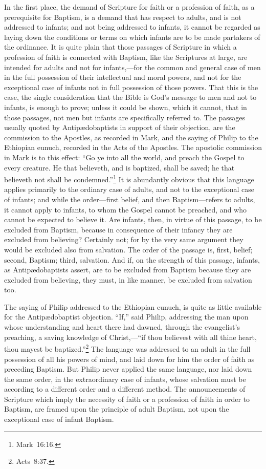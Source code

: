 \documentclass[
]{book}
\begin{document}
In the first place, the demand of Scripture for faith or a profession of faith, as a prerequisite for Baptism, is a demand that has respect to adults, and is not addressed to infants; and not being addressed to infants, it cannot be regarded as laying down the conditions or terms on which infants are to be made partakers of the ordinance. It is quite plain that those passages of Scripture in which a profession of faith is connected with Baptism, like the Scriptures at large, are intended for adults and not for infants,---for the common and general case of men in the full possession of their intellectual and moral powers, and not for the exceptional case of infants not in full possession of those powers. That this is the case, the single consideration that the Bible is God's message to men and not to infants, is enough to prove; unless it could be shown, which it cannot, that in those passages, not men but infants are specifically referred to. The passages usually quoted by Antipædobaptists in support of their objection, are the commission to the Apostles, as recorded in Mark, and the saying of Philip to the Ethiopian eunuch, recorded in the Acts of the Apostles. The apostolic commission in Mark is to this effect: ``Go ye into all the world, and preach the Gospel to every creature. He that believeth, and is baptized, shall be saved; he that believeth not shall be condemned.''\footnote{Mark~16:16.} It is abundantly obvious that this language applies primarily to the ordinary case of adults, and not to the exceptional case of infants; and while the order---first belief, and then Baptism---refers to adults, it cannot apply to infants, to whom the Gospel cannot be preached, and who cannot be expected to believe it. Are infants, then, in virtue of this passage, to be excluded from Baptism, because in consequence of their infancy they are excluded from believing? Certainly not; for by the very same argument they would be excluded also from salvation. The order of the passage is, first, belief; second, Baptism; third, salvation. And if, on the strength of this passage, infants, as Antipædobaptists assert, are to be excluded from Baptism because they are excluded from believing, they must, in like manner, be excluded from salvation too.

The saying of Philip addressed to the Ethiopian eunuch, is quite as little available for the Antipædobaptist objection. ``If,'' said Philip, addressing the man upon whose understanding and heart there had dawned, through the evangelist's preaching, a saving knowledge of Christ,---``if thou believest with all thine heart, thou mayest be baptized.''\footnote{Acts~8:37.} The language was addressed to an adult in the full possession of all his powers of mind, and laid down for him the order of faith as preceding Baptism. But Philip never applied the same language, nor laid down the same order, in the extraordinary case of infants, whose salvation must be according to a different order and a different method. The announcements of Scripture which imply the necessity of faith or a profession of faith in order to Baptism, are framed upon the principle of adult Baptism, not upon the exceptional case of infant Baptism.
\end{document}
